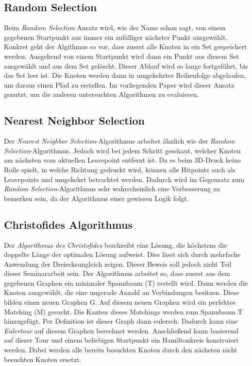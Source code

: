 \documentclass[12pt, a4paper]{article}
\begin{document}
\subsection{Random Selection}
Beim \textit{Random Selection} Ansatz wird, wie der Name schon sagt, von einem gegebenen Startpunkt aus immer ein zufälliger nächster Punkt ausgewählt. Konkret geht der Algithmus so vor, dass zuerst alle Knoten in ein Set gespeichert werden. Ausgehend von einem Startpunkt wird dann ein Punkt aus diesem Set ausgewählt und aus dem Set gelöscht. Dieser Ablauf wird so lange fortgeführt, bis das Set leer ist. Die Knoten werden dann in umgekehrter Reihenfolge abgelaufen, um daraus einen Pfad zu erstellen. Im vorliegenden Paper wird dieser Ansatz genutzt, um die anderen untersuchten Algorithmen zu evaluieren.

\subsection{Nearest Neighbor Selection}
Der \textit{Nearest Neighbor Selection}-Algorithmus arbeitet ähnlich wie der \textit{Random Selection}-Algorithmus. Jedoch wird bei jedem Schritt geschaut, welcher Knoten am nächsten vom aktuellen Leavepoint entfernt ist. Da es beim 3D-Druck keine Rolle spielt, in welche Richtung gedruckt wird, können alle Hitpoints auch als Leavepoints und umgekehrt betrachtet werden. Dadurch wird im Gegensatz zum \textit{Random Selection}-Algorithmus sehr wahrscheinlich eine Verbesserung zu bemerken sein, da der Algorithmus einer gewissen Logik folgt.

\subsection{Christofides Algorithmus}
Der \textit{Algorithmus des Christofides} beschreibt eine Lösung, die höchstens die doppelte Länge der optimalen Lösung aufweist. Dies lässt sich durch mehrfache Anwendung der Dreiecksungleich zeigen. Dieser Beweis soll jedoch nicht Teil dieser Seminararbeit sein. 
Der Algorithmus arbeitet so, dass zuerst aus dem gegebenen Graphen ein minimaler Spannbaum (T) erstellt wird. Dann werden die Knoten ausgewählt, die eine ungerade Anzahl an Verbindungen besitzen. Diese bilden einen neuen Graphen G.  Auf diesem neuen Graphen wird ein perfektes Matching (M) gesucht. Die Kanten dieses Matchings werden zum Spannbaum T hinzugefügt. Per Definition ist dieser Graph dann eulersch. Dadurch kann eine \textit{Eulertour} auf diesem Graphen berechnet werden. Anschließend kann basierend auf dieser Tour und einem beliebigen Startpunkt ein Hamiltonkreis konstruiert werden. Dabei werden alle bereits besuchten Knoten durch den nächsten nicht besuchten Knoten ersetzt. \cite[vgl.]{Chr76}
\end{document}

